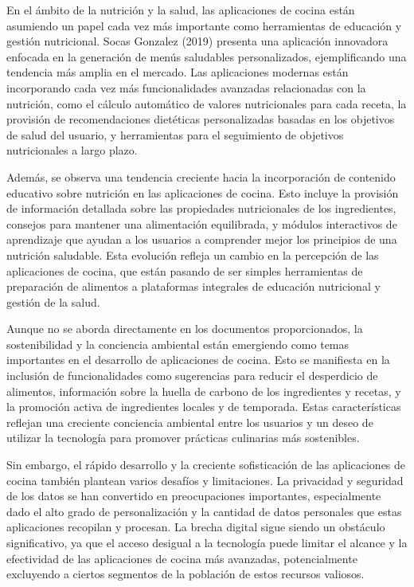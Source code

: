 \documentclass[a4paper,12pt]{article}
\begin{document}
En el ámbito de la nutrición y la salud, las aplicaciones de cocina están asumiendo un papel cada vez más importante como herramientas de educación y gestión nutricional. Socas Gonzalez (2019) presenta una aplicación innovadora enfocada en la generación de menús saludables personalizados, ejemplificando una tendencia más amplia en el mercado. Las aplicaciones modernas están incorporando cada vez más funcionalidades avanzadas relacionadas con la nutrición, como el cálculo automático de valores nutricionales para cada receta, la provisión de recomendaciones dietéticas personalizadas basadas en los objetivos de salud del usuario, y herramientas para el seguimiento de objetivos nutricionales a largo plazo.

Además, se observa una tendencia creciente hacia la incorporación de contenido educativo sobre nutrición en las aplicaciones de cocina. Esto incluye la provisión de información detallada sobre las propiedades nutricionales de los ingredientes, consejos para mantener una alimentación equilibrada, y módulos interactivos de aprendizaje que ayudan a los usuarios a comprender mejor los principios de una nutrición saludable. Esta evolución refleja un cambio en la percepción de las aplicaciones de cocina, que están pasando de ser simples herramientas de preparación de alimentos a plataformas integrales de educación nutricional y gestión de la salud.

Aunque no se aborda directamente en los documentos proporcionados, la sostenibilidad y la conciencia ambiental están emergiendo como temas importantes en el desarrollo de aplicaciones de cocina. Esto se manifiesta en la inclusión de funcionalidades como sugerencias para reducir el desperdicio de alimentos, información sobre la huella de carbono de los ingredientes y recetas, y la promoción activa de ingredientes locales y de temporada. Estas características reflejan una creciente conciencia ambiental entre los usuarios y un deseo de utilizar la tecnología para promover prácticas culinarias más sostenibles.
 
Sin embargo, el rápido desarrollo y la creciente sofisticación de las aplicaciones de cocina también plantean varios desafíos y limitaciones. La privacidad y seguridad de los datos se han convertido en preocupaciones importantes, especialmente dado el alto grado de personalización y la cantidad de datos personales que estas aplicaciones recopilan y procesan. La brecha digital sigue siendo un obstáculo significativo, ya que el acceso desigual a la tecnología puede limitar el alcance y la efectividad de las aplicaciones de cocina más avanzadas, potencialmente excluyendo a ciertos segmentos de la población de estos recursos valiosos.
\end{document}
